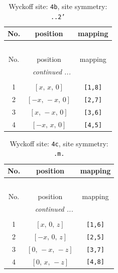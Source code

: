 \documentclass[fleqn,8pt]{jsarticle}
\begin{document}
\begin{longtable}{ccc}
\caption{Wyckoff site: {\tt 4b}, site symmetry: {\tt ..2'}}
 \\
 \hline \hline
No. & position & mapping \\ \hline \endfirsthead

\multicolumn{2}{l}{\tablename\ \thetable{}} \\
 \hline \hline
No. & position & mapping \\ \hline \endhead

 \hline \hline
\multicolumn{2}{r}{\footnotesize\it continued ...} \\ \endfoot

 \hline \hline
\multicolumn{2}{r}{} \\ \endlastfoot

1 & $\left[ x,\, x,\, 0 \right]$ & {\tt [1,8]} \\ \hline
2 & $\left[ - x,\, - x,\, 0 \right]$ & {\tt [2,7]} \\ \hline
3 & $\left[ x,\, - x,\, 0 \right]$ & {\tt [3,6]} \\ \hline
4 & $\left[ - x,\, x,\, 0 \right]$ & {\tt [4,5]} \\
\end{longtable}
\renewcommand{\arraystretch}{1.2}
\begin{longtable}{ccc}
\caption{Wyckoff site: {\tt 4c}, site symmetry: {\tt .m.}}
 \\
 \hline \hline
No. & position & mapping \\ \hline \endfirsthead

\multicolumn{2}{l}{\tablename\ \thetable{}} \\
 \hline \hline
No. & position & mapping \\ \hline \endhead

 \hline \hline
\multicolumn{2}{r}{\footnotesize\it continued ...} \\ \endfoot

 \hline \hline
\multicolumn{2}{r}{} \\ \endlastfoot

1 & $\left[ x,\, 0,\, z \right]$ & {\tt [1,6]} \\ \hline
2 & $\left[ - x,\, 0,\, z \right]$ & {\tt [2,5]} \\ \hline
3 & $\left[ 0,\, - x,\, - z \right]$ & {\tt [3,7]} \\ \hline
4 & $\left[ 0,\, x,\, - z \right]$ & {\tt [4,8]} \\
\end{longtable}
\renewcommand{\arraystretch}{1.2}
\end{document}
